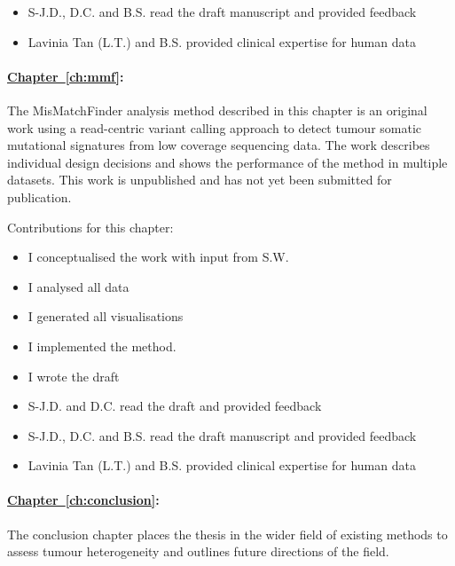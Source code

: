 {\begin{itemize}

	\item S-J.D., D.C. and  B.S. read the draft manuscript and provided feedback
	\item Lavinia Tan (L.T.) and B.S. provided clinical expertise for human data
	
\end{itemize}

\paragraph*{\hyperref[ch:mmf]{Chapter~\ref*{ch:mmf}}:}
The MisMatchFinder analysis method described in this chapter is an original work using a read-centric variant calling approach to detect tumour somatic mutational signatures from low coverage sequencing data. The work describes individual design decisions and shows the performance of the method in multiple datasets. This work is unpublished and has not yet been submitted for publication.

Contributions for this chapter:
\begin{itemize}
   	\item I conceptualised the work with input from S.W.
	\item I analysed all data
	\item I generated all visualisations
	\item I implemented the method.
	\item I wrote the draft
	\item S-J.D. and D.C. read the draft and provided feedback
	

	\item S-J.D., D.C. and  B.S. read the draft manuscript and provided feedback
	\item Lavinia Tan (L.T.) and B.S. provided clinical expertise for human data
	
\end{itemize}

\paragraph*{\hyperref[ch:conclusion]{Chapter~\ref*{ch:conclusion}}:}
The conclusion chapter places the thesis in the wider field of existing methods to assess tumour heterogeneity and outlines future directions of the field.

}
